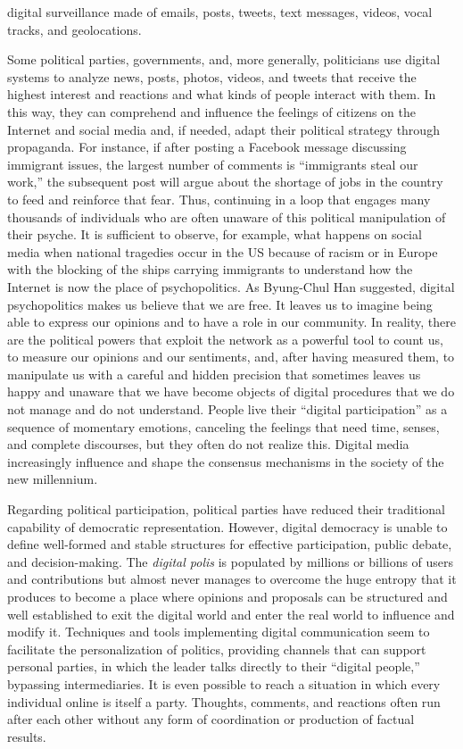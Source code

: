 digital surveillance made of emails, posts, tweets, text messages, videos, vocal tracks, and geolocations.

Some political parties, governments, and, more generally, politicians use digital systems to analyze news, posts, photos, videos, and tweets that receive the highest interest and reactions and what kinds of people interact with them. In this way, they can comprehend and influence the feelings of citizens on the Internet and social media and, if needed, adapt their political strategy through propaganda. For instance, if after posting a Facebook message discussing immigrant issues, the largest number of comments is ``immigrants steal our work,'' the subsequent post will argue about the shortage of jobs in the country to feed and reinforce that fear. Thus, continuing in a loop that engages many thousands of individuals who are often unaware of this political manipulation of their psyche. It is sufficient to observe, for example, what happens on social media when national tragedies occur in the US because of racism or in Europe with the blocking of the ships carrying immigrants to understand how the Internet is now the place of psychopolitics. As Byung-Chul Han suggested, digital psychopolitics makes us believe that we are free. It leaves us to imagine being able to express our opinions and to have a role in our community. In reality, there are the political powers that exploit the network as a powerful tool to count us, to measure our opinions and our sentiments, and, after having measured them, to manipulate us with a careful and hidden precision that sometimes leaves us happy and unaware that we have become objects of digital procedures that we do not manage and do not understand. People live their ``digital participation'' as a sequence of momentary emotions, canceling the feelings that need time, senses, and complete discourses, but they often do not realize this. Digital media increasingly influence and shape the consensus mechanisms in the society of the new millennium.


Regarding political participation, political parties have reduced their traditional capability of democratic representation. However, digital democracy is unable to define well-formed and stable structures for effective participation, public debate, and decision-making. The \textit{digital polis} is populated by millions or billions of users and contributions but almost never manages to overcome the huge entropy that it produces to become a place where opinions and proposals can be structured and well established to exit the digital world and enter the real world to influence and modify it. Techniques and tools implementing digital communication seem to facilitate the personalization of politics, providing channels that can support personal parties, in which the leader talks directly to their ``digital people,'' bypassing intermediaries. It is even possible to reach a situation in which every individual online is itself a party. Thoughts, comments, and reactions often run after each other without any form of coordination or production of factual results.

